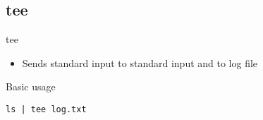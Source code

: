\subsection{tee}

\begin{frame}[fragile]{tee}
  \begin{itemize}
    \pause \item Sends standard input to standard input and to log file
  \end{itemize}
  \begin{exampleblock}{Basic usage}
    \begin{lstlisting}[showstringspaces=false,basicstyle=\tiny]
ls | tee log.txt
    \end{lstlisting}
  \end{exampleblock}
\end{frame}


